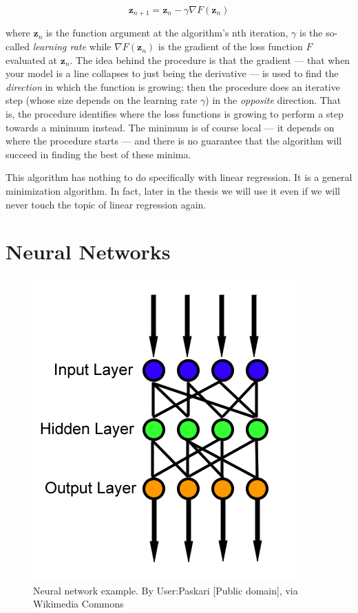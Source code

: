 \begin{equation}
  \boldsymbol{z}_{n+1} = \boldsymbol{z}_n - \gamma
  \nabla{F}(\boldsymbol{z}_n)
\end{equation}

where $\boldsymbol{z}_n$ is the function argument at the algorithm's
nth iteration, $\gamma$ is the so-called \emph{learning rate} while
$\nabla{F}(\boldsymbol{z}_n)$ is the gradient of the loss function $F$
evaluated at $\boldsymbol{z}_n$. The idea behind the procedure is that
the gradient --- that when your model is a line collapses to just
being the derivative --- is used to find the \emph{direction} in which
the function is growing; then the procedure does an iterative step (whose size
depends on the learning rate $\gamma$) in the \emph{opposite}
direction. That is, the procedure identifies where the loss functions
is growing to perform a step towards a minimum instead. The minimum is
of course local --- it depends on where the procedure starts --- and
there is no guarantee that the algorithm will succeed in finding the
best of these minima.

This algorithm has nothing to do specifically with linear regression.
It is a general minimization algorithm. In fact, later in the thesis
we will use it even if we will never touch the topic of linear regression
again.

\section{Neural Networks}
\label{sec:neural-networks}

\begin{figure}
  \centering
  \includegraphics[width=0.5\linewidth]{Images/wikipedia-neural-network.png}
  \caption{Neural network example. By User:Paskari [Public domain], via
    Wikimedia Commons}
  \label{fig:wikipedia-neural-network}
\end{figure}

